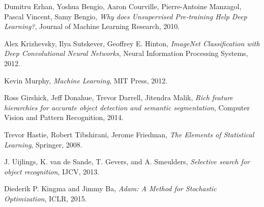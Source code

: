 \documentclass [11pt,letterpaper ,twoside ,openany ]{report}
\begin{document}
\begin{thebibliography}{9}
          Dumitru Erhan, Yoshua Bengio, Aaron Courville, Pierre-Antoine Manzagol, Pascal Vincent, Samy Bengio,
          \textit{Why does Unsupervised Pre-training Help Deep Learning?},
          Journal of Machine Learning Research,
          2010.                                       

          Alex Krizhevsky, Ilya Sutskever, Geoffrey E. Hinton,
          \textit{ImageNet Classification with Deep Convolutional Neural Networks},
          Neural Information Processing Systems,
          2012.        

          Kevin Murphy,
          \textit{Machine Learning},
          MIT Press,
          2012.            

          Ross Girshick, Jeff Donahue, Trevor Darrell, Jitendra Malik,
          \textit{Rich feature hierarchies for accurate object detection and semantic segmentation},
          Computer Vision and Pattern Recognition,
          2014.                                           

          Trevor Hastie, Robert Tibshirani, Jerome Friedman,
          \textit{The Elements of Statistical Learning},
          Springer,
          2008.                         

          J. Uijlings, K. van de Sande, T. Gevers, and A. Smeulders,
          \textit{Selective search for object recognition},
          IJCV,
          2013.                         

          Diederik P. Kingma and Jimmy Ba,
          \textit{Adam: A Method for Stochastic Optimization},
          ICLR,
          2015.                                   


    \end{thebibliography}
\end{document}
